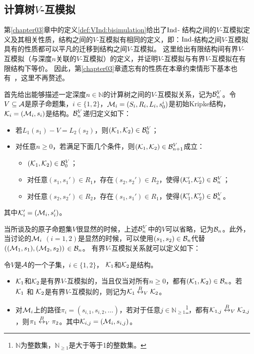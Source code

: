 \subsection{计算树$V$-互模拟}
第\ref{chapter03}章中的定义\ref{def:VInd:bisimulation}给出了$\textrm{Ind}$- 结构之间的$V$-互模拟定义及其相关性质，结构之间的$V$-互模拟有相同的定义，即：$\textrm{Ind}$-结构之间$V$-互模拟具有的性质都可以平凡的迁移到结构之间$V$-互模拟。
这里给出有限结构间有界$V$-互模拟（与深度$n$关联的$V$-互模拟）的定义，并证明$V$-互模拟与有界$V$-互模拟在有限结构下等价。
因此，第\ref{chapter03}章遗忘有的性质在本章约束情形下基本也有~\cite{renyansfirstpaper}，这里不再赘述。

首先给出能够描述一定深度$n\in \mathbb{N}$的计算树之间的$V$-互模拟关系，记为${\cal B}_n^V$。令$V\subseteq {\cal A}$是原子命题集，$i\in \{1,2\}$，${\cal M}_i=(S_i,R_i,L_i,s_0^i)$是初始Kripke结构，${\cal K}_i=({\cal M}_i, s_i)$是结构。${\cal B}_n^V$递归定义如下：
\begin{itemize}
	\item 若$L_1(s_1)-V=L_2(s_2)$，则$({\cal K}_1,{\cal K}_2) \in {\cal B}_0^V$；
	\item 对任意$n\ge 0$，若满足下面几个条件，则$({\cal K}_1,{\cal K}_2)\in {\cal B}_{n+1}^V$成立：
	\begin{itemize}
		\item $({\cal K}_1,{\cal K}_2) \in {\cal B}_0^V$；
		\item 对任意$(s_1,s_1')\in R_1$，存在$(s_2,s_2')\in R_2$，使得$({\cal K}_1',{\cal K}_2') \in {\cal B}_n^V$；
		\item 对任意$(s_2,s_2')\in R_2$，存在$(s_1,s_1')\in R_1$，使得$({\cal K}_1',{\cal K}_2') \in {\cal B}_n^V$。
	\end{itemize}
\end{itemize}
其中${\cal K}_i'=({\cal M}_i,s_i')$。

当所谈及的原子命题集$V$很显然的时候，上述${\cal B}_n^V$中的$V$可以省略，记为${\cal B}_n$。此外，当讨论的${\cal M}_i$ $(i=1,2)$是显然的时候，可以使用$(s_1,s_2) \in {\cal B}_n$代替$(({\cal M}_1,s_1),({\cal M}_2,s_2))$ $\in {\cal B}_n$。
有界$V$-互模拟关系就可以定义如下：
\begin{definition}[有界$V$-互模拟]\label{def:V-bisimulation}
	令$V$是${\cal A}$的一个子集，$i\in \{1,2\}$， ${\cal K}_1$和${\cal K}_2$是结构。
	\begin{itemize}
		\item ${\cal K}_1$和${\cal K}_2$是有界$V$-互模拟的，当且仅当对所有$n \ge 0$，都有$({\cal K}_1, {\cal K}_2)\in {\cal B}_n$。若 ${\cal K}_1$ 和 ${\cal K}_2$是有界$V$-互模拟的，则记为${\cal K}_1 \overset{B}{\leftrightarrow}_V {\cal K}_2$。
		\item 对${\cal M}_i$上的路径$\pi_i=(s_{i,1},s_{i,2},\dots)$，若对于任意$j\in \mathbb{N}_{\ge 1}$\footnote{$\mathbb{N}$为整数集，$\mathbb{N}_{\ge 1}$是大于等于1的整数集。}，都有${\cal K}_{1,j} \overset{B}{\leftrightarrow}_V {\cal K}_{2,j}$，则$\pi_1 \overset{B}{\leftrightarrow}_V \pi_2$。其中${\cal K}_{i, j}=({\cal M}_i, s_{i,j})$。
	\end{itemize}
\end{definition}

